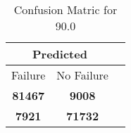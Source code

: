 \begin{table}[] 
\label{Table: Prediction Accuracy-DMD90.0OnlySunEKF-ignoreReflection-Reflection} 
\caption{Confusion Matric for 90.0} 
\centering 
\begin{tabular} 
 {@{}ccc@{}} 
\toprule 
\multicolumn{2}{c}{\textbf{Predicted}}
 \\ \midrule 
\multicolumn{1}{|c|}{Failure} & 
\multicolumn{1}{c|}{No Failure}
 \\ \midrule 
\multicolumn{1}{|c|}{\color{green}\textbf{81467}} & 
\multicolumn{1}{c|}{\color{red}\textbf{9008}}
 \\ \midrule 
\multicolumn{1}{|c|}{\color{red}\textbf{7921}} & 
\multicolumn{1}{c|}{\color{green}\textbf{71732}}
 \\ \bottomrule 
\end{tabular} 
\end{table} 
